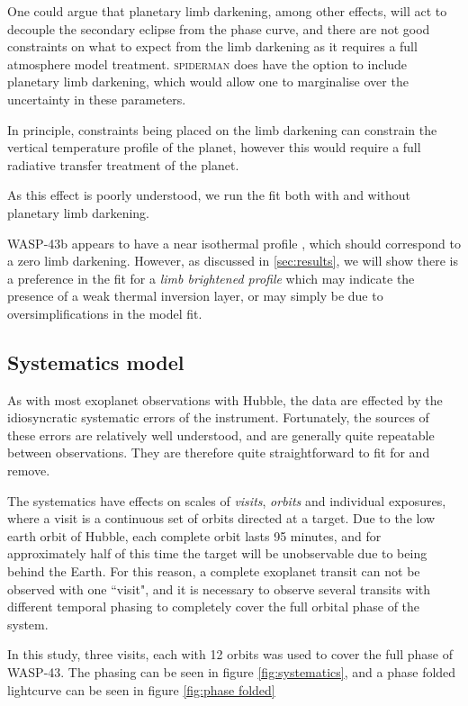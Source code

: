 \documentclass[a4paper,fleqn,usenatbib]{mnras}
\begin{document}
One could argue that planetary limb darkening, among other effects, will act to decouple the secondary eclipse from the phase curve, and there are not good constraints on what to expect from the limb darkening as it requires a full atmosphere model treatment. \textsc{spiderman} does have the option to include planetary limb darkening, which would allow one to marginalise over the uncertainty in these parameters. 

In principle, constraints being placed on the limb darkening can constrain the vertical temperature profile of the planet, however this would require a full radiative transfer treatment of the planet.

As this effect is poorly understood, we run the fit both with and without planetary limb darkening.

WASP-43b appears to have a near isothermal profile \citep{Stevenson2014}, which should correspond to a zero limb darkening. However, as discussed in \ref{sec:results}, we will show there is a preference in the fit for a \emph{limb brightened profile} which may indicate the presence of a weak thermal inversion layer, or may simply be due to oversimplifications in the model fit.

\subsection{Systematics model}\label{sec:systematics}

As with most exoplanet observations with Hubble, the data are effected by the idiosyncratic systematic errors of the instrument. Fortunately, the sources of these errors are relatively well understood, and are generally quite repeatable between observations. They are therefore quite straightforward to fit for and remove. 

The systematics have effects on scales of \emph{visits}, \emph{orbits} and individual exposures, where a visit is a continuous set of orbits directed at a target. Due to the low earth orbit of Hubble, each complete orbit lasts 95 minutes, and for approximately half of this time the target will be unobservable due to being behind the Earth. For this reason, a complete exoplanet transit can not be observed with one ``visit", and it is necessary to observe several transits with different temporal phasing to completely cover the full orbital phase of the system.

In this study, three visits, each with 12 orbits was used to cover the full phase of WASP-43. The phasing can be seen in figure \ref{fig:systematics}, and a phase folded lightcurve can be seen in figure \ref{fig:phase folded}
\end{document}
